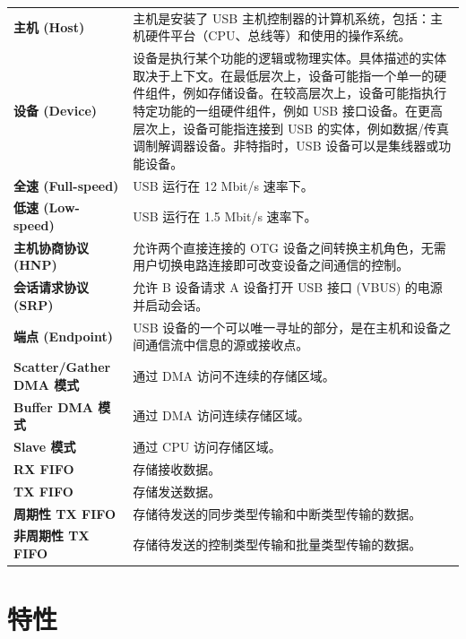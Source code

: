 \documentclass[main\_\_CN.tex]{subfiles}
\begin{document}
\begin{longtable}[c]{ R{5cm} p{10cm} }
\textbf{主机 (Host)}     & 主机是安装了 USB 主机控制器的计算机系统，包括：主机硬件平台（CPU、总线等）和使用的操作系统。\\
\textbf{设备 (Device)}   & 设备是执行某个功能的逻辑或物理实体。具体描述的实体取决于上下文。在最低层次上，设备可能指一个单一的硬件组件，例如存储设备。在较高层次上，设备可能指执行特定功能的一组硬件组件，例如 USB 接口设备。在更高层次上，设备可能指连接到 USB 的实体，例如数据/传真调制解调器设备。非特指时，USB 设备可以是集线器或功能设备。\\
\textbf{全速 (Full-speed)}  & USB 运行在 12 Mbit/s 速率下。\\
\textbf{低速 (Low-speed)} & USB 运行在 1.5 Mbit/s 速率下。\\
\textbf{主机协商协议 (HNP)} & 允许两个直接连接的 OTG 设备之间转换主机角色，无需用户切换电路连接即可改变设备之间通信的控制。\\
\textbf{会话请求协议 (SRP)} & 允许 B 设备请求 A 设备打开 USB 接口 (VBUS) 的电源并启动会话。\\
\textbf{端点 (Endpoint)}& USB 设备的一个可以唯一寻址的部分，是在主机和设备之间通信流中信息的源或接收点。\\
\textbf{Scatter/Gather DMA 模式} & 通过 DMA 访问不连续的存储区域。\\
\textbf{Buffer DMA 模式}& 通过 DMA 访问连续存储区域。\\
\textbf{Slave 模式}& 通过 CPU 访问存储区域。\\
\textbf{RX FIFO} & 存储接收数据。 \\
\textbf{TX FIFO} & 存储发送数据。\\
\textbf{周期性 TX FIFO} & 存储待发送的同步类型传输和中断类型传输的数据。\\
\textbf{非周期性 TX FIFO} & 存储待发送的控制类型传输和批量类型传输的数据。\\
\end{longtable}

\section{特性}
\end{document}
